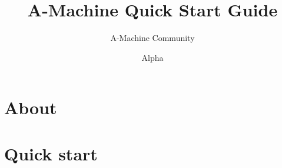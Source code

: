 \documentclass[11pt]{book}
\title{A-Machine Quick Start Guide}
\author{A-Machine Community}
\date{Alpha}
\begin{document}
\maketitle
\def\title#1{\chapter{#1}}
\tableofcontents

\part{About}
        
        
\part{Quick start}
        
        
        
        
        
        
        
        
\end{document}
